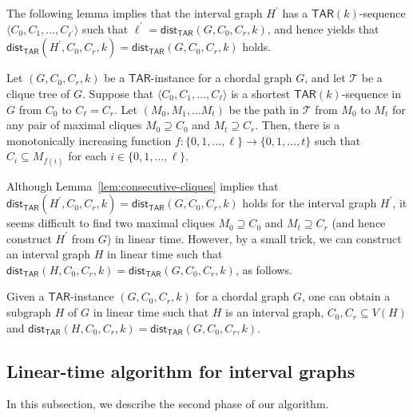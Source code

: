 \documentclass{llncs}
\newcommand{\TAR}[1]{\mathsf{TAR}(#1)}
\newcommand{\ini}{0}
\newcommand{\tar}{r}
\newcommand{\cliq}{C}
\newcommand{\TARrule}{\mathsf{TAR}}
\newcommand{\distTARG}[4]{\mathsf{dist_{TAR}}(#1,#2,#3,#4)}
\newcommand{\subH}{H}
\newcommand{\subHp}{H^\prime}
\newcounter{one}
\newcounter{two}
\begin{document}
	The following lemma implies that the interval graph $\subHp$ has a $\TAR{k}$-sequence $\langle \cliq_{0}, \cliq_1, \ldots, \cliq_{\ell^\prime} \rangle$ such that $\ell^\prime = \distTARG{G}{\cliq_{\ini}}{\cliq_{\tar}}{k}$, and hence yields that $\distTARG{\subHp}{\cliq_{\ini}}{\cliq_{\tar}}{k} = \distTARG{G}{\cliq_{\ini}}{\cliq_{\tar}}{k}$ holds. 
	\begin{lemma} \label{lem:consecutive-cliques}
	Let $(G, \cliq_{\ini}, \cliq_{\tar}, k)$ be a $\TARrule$-instance for a chordal graph $G$, and let $\mathcal{T}$ be a clique tree of $G$.
	Suppose that $\langle \cliq_{\ini}, \cliq_1, \ldots, \cliq_{\ell} \rangle$ is a shortest $\TAR{k}$-sequence in $G$ from $\cliq_{\ini}$ to $\cliq_{\ell} = \cliq_{\tar}$.
Let $(M_{0}, M_1, \dots M_{t})$ be the path in $\mathcal{T}$ from $M_{0}$ to $M_{t}$ for any pair of maximal cliques $M_{0} \supseteq \cliq_0$ and $M_{t} \supseteq \cliq_{\tar}$.
	Then, there is a monotonically increasing function $f \colon \{0,1,\dots,\ell\} \to \{0, 1,\dots, t\}$ such that $C_{i} \subseteq M_{f(i)}$ for each $i \in \{0,1,\ldots,\ell\}$.
\end{lemma}

	Although Lemma~\ref{lem:consecutive-cliques} implies that $\distTARG{\subHp}{\cliq_{\ini}}{\cliq_{\tar}}{k} = \distTARG{G}{\cliq_{\ini}}{\cliq_{\tar}}{k}$ holds for the interval graph $\subHp$, it seems difficult to find two maximal cliques $M_{0} \supseteq \cliq_0$ and $M_{t} \supseteq \cliq_{\tar}$ (and hence construct $\subHp$ from $G$) in linear time. 
	However, by a small trick, we can construct an interval graph $\subH$ in linear time such that $\distTARG{\subH}{\cliq_{\ini}}{\cliq_{\tar}}{k} = \distTARG{G}{\cliq_{\ini}}{\cliq_{\tar}}{k}$, as follows.
	\begin{lemma} \label{lem:chordal->interval}
	Given a $\TARrule$-instance $(G, \cliq_{\ini}, \cliq_{\tar}, k)$ for a chordal graph $G$, one can obtain a subgraph $\subH$ of $G$ in linear time such that $\subH$ is an interval graph, $\cliq_{\ini}, \cliq_{\tar} \subseteq V(\subH)$ and $\distTARG{\subH}{\cliq_{\ini}}{\cliq_{\tar}}{k} = \distTARG{G}{\cliq_{\ini}}{\cliq_{\tar}}{k}$.
	\end{lemma}


\subsection{Linear-time algorithm for interval graphs} \label{subsec:interval}

	In this subsection, we describe the second phase of our algorithm.
\end{document}
